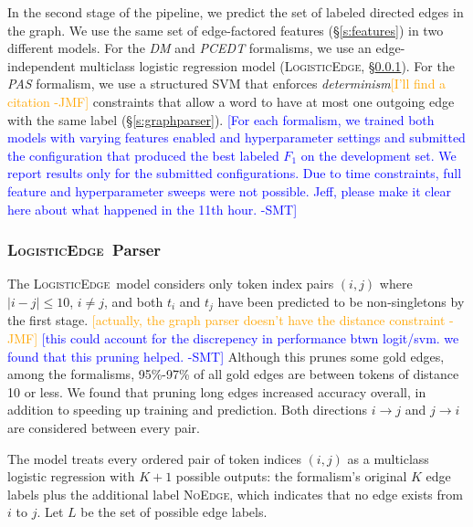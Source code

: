 \documentclass[11pt]{article}
\newcommand{\bocomment}[1]{\textcolor{Bittersweet}{[#1 -BTO]}}
\newcommand{\sam}[1]{\textcolor{blue}{[#1 -SMT]}}
\newcommand{\jmf}[1]{\textcolor{orange}{[#1 -JMF]}}
\newcommand{\codenote}[1]{}
\newcommand{\logitedge}{\textsc{LogisticEdge}}
\newcommand{\noedge}{\textsc{NoEdge}}
\begin{document}
In the second stage of the pipeline, we predict the set of labeled directed
edges in the graph.
We use the same set of edge-factored features (\S\ref{s:features}) in two
different models.
For the \emph{DM} and \emph{PCEDT} formalisms, we use an edge-independent multiclass logistic
regression model (\logitedge, \S\ref{s:logitedge}).
For the \emph{PAS} formalism, we use a structured SVM 
\cite{taskar_max_2003,tsochantaridis_support_2004} that enforces 
\emph{determinism}\jmf{I'll find a citation} constraints that allow a word to
have at most one outgoing edge with the
same label (\S\ref{s:graphparser}).
\sam{For each formalism, we trained both models with varying features enabled
and hyperparameter settings and submitted the configuration that produced the
best labeled $F_1$ on the development set.
We report results only for the submitted configurations.
Due to time constraints, full feature and hyperparameter sweeps were not
possible.
Jeff, please make it clear here about what happened in the 11th
hour.}


\subsubsection{\logitedge\ Parser}
\label{s:logitedge}


\codenote{LRParser.java}

The \logitedge\ model considers only token index pairs $(i, j)$ where %
$|i-j| \leq 10$, $i \ne j$, and both $t_i$ and
$t_j$ have been predicted to be non-singletons by the first stage.
\jmf{actually, the graph parser doesn't have the distance constraint}
\sam{this could account for the discrepency in performance btwn logit/svm. we
found that this pruning helped.}
Although this prunes some gold edges, among the formalisms,
95\%-97\% of all gold edges are between tokens of distance 10 or less.
We found that pruning long edges increased accuracy overall, in addition to
speeding up training and prediction.
Both directions $i \rightarrow j$ and $j \rightarrow
i$ are considered between every pair.

The model treats every ordered pair of token indices $(i, j)$ as a
multiclass logistic regression with $K+1$ possible outputs:
the formalism's original $K$ edge labels plus the additional label \noedge,
which indicates that no edge exists from $i$ to $j$.
Let $L$ be the set of possible edge labels.
\end{document}
